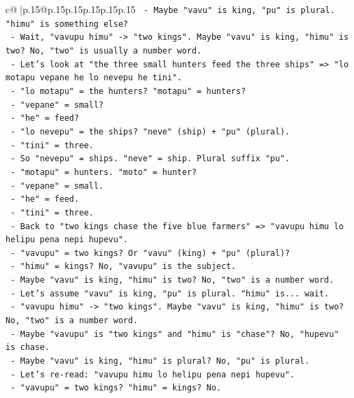 \documentclass{article}
\begin{document}
{\begin{supertabular}{c@{$\;$}|p{.15\linewidth}@{}p{.15\linewidth}p{.15\linewidth}p{.15\linewidth}p{.15\linewidth}p{.15\linewidth}}
{{{\texttt{      {-} Maybe "vavu" is king, "pu" is plural. "himu" is something else?} \\
\texttt{      {-} Wait, "vavupu himu" {-}> "two kings". Maybe "vavu" is king, "himu" is two? No, "two" is usually a number word.} \\
\texttt{      {-} Let's look at "the three small hunters feed the three ships" => "lo motapu vepane he lo nevepu he tini".} \\
\texttt{        {-} "lo motapu" = the hunters? "motapu" = hunters?} \\
\texttt{        {-} "vepane" = small?} \\
\texttt{        {-} "he" = feed?} \\
\texttt{        {-} "lo nevepu" = the ships? "neve" (ship) + "pu" (plural).} \\
\texttt{        {-} "tini" = three.} \\
\texttt{        {-} So "nevepu" = ships. "neve" = ship. Plural suffix "pu".} \\
\texttt{        {-} "motapu" = hunters. "moto" = hunter?} \\
\texttt{        {-} "vepane" = small.} \\
\texttt{        {-} "he" = feed.} \\
\texttt{        {-} "tini" = three.} \\
\texttt{      {-} Back to "two kings chase the five blue farmers" => "vavupu himu lo helipu pena nepi hupevu".} \\
\texttt{        {-} "vavupu" = two kings? Or "vavu" (king) + "pu" (plural)?} \\
\texttt{        {-} "himu" = kings? No, "vavupu" is the subject.} \\
\texttt{        {-} Maybe "vavu" is king, "himu" is two? No, "two" is a number word.} \\
\texttt{        {-} Let's assume "vavu" is king, "pu" is plural. "himu" is... wait.} \\
\texttt{        {-} "vavupu himu" {-}> "two kings". Maybe "vavu" is king, "himu" is two? No, "two" is a number word.} \\
\texttt{        {-} Maybe "vavupu" is "two kings" and "himu" is "chase"? No, "hupevu" is chase.} \\
\texttt{        {-} Maybe "vavu" is king, "himu" is plural? No, "pu" is plural.} \\
\texttt{        {-} Let's re{-}read: "vavupu himu lo helipu pena nepi hupevu".} \\
\texttt{        {-} "vavupu" = two kings? "himu" = kings? No.} \\
}}}
\end{supertabular}}
\end{document}
